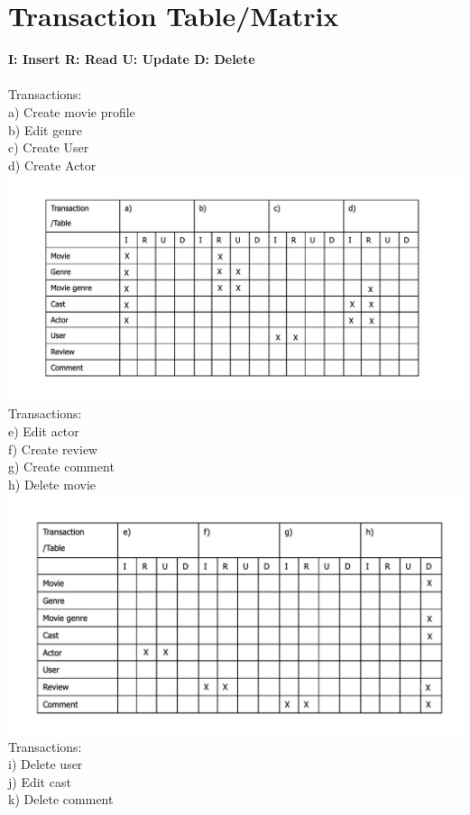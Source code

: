 \documentclass[12pt]{article}
\begin{document}
\section{Transaction Table/Matrix}
\textbf{I: Insert R: Read U: Update D: Delete}\\\\
Transactions:\\ 
a)	Create movie profile\\
b)	Edit genre \\
c)	Create User\\
d)	Create Actor\\
\includegraphics[width=1\linewidth]{tm1.jpg}
\\
Transactions:\\
e)	Edit actor \\
f)	Create review\\
g)	Create comment\\
h)	Delete movie\\
\includegraphics[width=1\linewidth]{tm2.jpg}
\\
Transactions:\\
i)	Delete user\\
j)	Edit cast \\
k)	Delete comment\\
\end{document}

